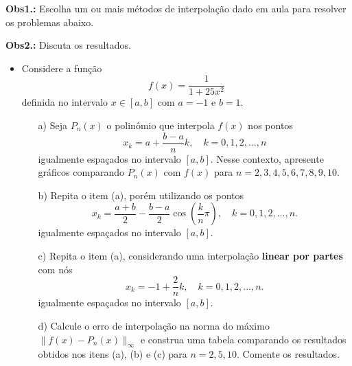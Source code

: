 \documentclass{article}
\newcounter{execs}
\newcommand{\exec}[0]{\addtocounter{execs}{1}\item[\textbf{\arabic{execs}.}]}
\begin{document}
\thispagestyle{first}
\noindent \textbf{Obs1.:}  Escolha um ou mais métodos de interpolação dado em aula para resolver os problemas abaixo.

\noindent \textbf{Obs2.:}  Discuta os resultados.

\begin{itemize}

\exec Considere a função
$$
f(x)=\dfrac{1}{1+25x^2}
$$
definida no intervalo $x\in [a,b]$ com $a=-1$ e $b=1$. 

\begin{itemize}

\item[a)] Seja $P_n(x)$ o polinômio que interpola $f(x)$ nos pontos
$$
x_k = a + \dfrac{b-a}{n}k, \quad k = 0,1,2,...,n
$$
igualmente espaçados no intervalo $[a,b]$. Nesse contexto,
apresente gráficos comparando $P_n(x)$ com $f(x)$ para $n= 2,3,4,5,6,7,8,9,10$.

\item [b)] Repita o item (a), porém utilizando os pontos
$$
x_k = \dfrac{a+b}{2} - \dfrac{b-a}{2}\cos\left(\dfrac{k}{n}\pi \right), \quad k = 0,1,2,...,n.
$$
igualmente espaçados no intervalo $[a,b]$.
\item [c)] Repita o item (a), considerando  uma interpolação \textbf{linear por partes} com nós
$$
x_k = -1 + \dfrac{2}{n}k, \quad k = 0,1,2,...,n.
$$
igualmente espaçados no intervalo $[a,b]$.

\item [d)] Calcule o erro de interpolação na norma do máximo $\|f(x)-P_n(x)\|_{\infty} $ e construa uma tabela comparando os resultados obtidos nos itens (a), (b) e (c) para $n = 2,5,10$. Comente os resultados.

\end{itemize}

\end{itemize}
\end{document}
